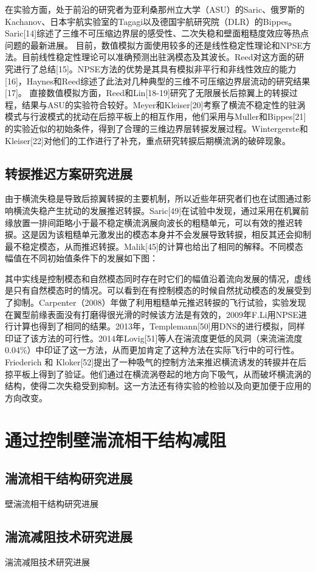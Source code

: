 在实验方面，处于前沿的研究者为亚利桑那州立大学（ASU）的Saric、俄罗斯的Kachanov、日本宇航实验室的Tagagi以及德国宇航研究院（DLR）的Bippes。Saric[14]综述了三维不可压缩边界层的感受性、二次失稳和壁面粗糙度效应等热点问题的最新进展。
目前，数值模拟方面使用较多的还是线性稳定性理论和NPSE方法。目前线性稳定性理论可以准确预测出驻涡模态及其波长。Reed对这方面的研究进行了总结[15]。NPSE方法的优势是其具有模拟非平行和非线性效应的能力[16]，Haynes和Reed综述了此法对几种典型的三维不可压缩边界层流动的研究结果[17]。
直接数值模拟方面，Reed和Lin[18-19]研究了无限展长后掠翼上的转捩过程，结果与ASU的实验符合较好。Meyer和Kleiser[20]考察了横流不稳定性的驻涡模式与行波模式的扰动在后掠平板上的相互作用，他们采用与Muller和Bippes[21]的实验近似的初始条件，得到了合理的三维边界层转捩发展过程。Wintergerste和Kleiser[22]对他们的工作进行了补充，重点研究转捩后期横流涡的破碎现象。

\subsection{转捩推迟方案研究进展}
由于横流失稳是导致后掠翼转捩的主要机制，所以近些年研究者们也在试图通过影响横流失稳产生扰动的发展推迟转捩。Saric[49]在试验中发现，通过采用在机翼前缘放置一排间距略小于最不稳定横流涡展向波长的粗糙单元，可以有效的推迟转捩。这是因为该粗糙单元激发出的模态本身并不会发展导致转捩，相反其还会抑制最不稳定模态，从而推迟转捩。Malik[45]的计算也给出了相同的解释。不同模态幅值在不同初始值条件下的发展如下图：

其中实线是控制模态和自然模态同时存在时它们的幅值沿着流向发展的情况，虚线是只有自然模态时的情况。可以看到在有控制模态的时候自然扰动模态的发展受到了抑制。Carpenter（2008）年做了利用粗糙单元推迟转捩的飞行试验，实验发现在翼型前缘表面没有打磨得很光滑的时候该方法是有效的，2009年F.Li用NPSE进行计算也得到了相同的结果。2013年，Templemann[50]用DNS的进行模拟，同样印证了该方法的可行性。2014年Lovig[51]等人在湍流度更低的风洞（来流湍流度0.04\%）中印证了这一方法，从而更加肯定了这种方法在实际飞行中的可行性。
Friederich 和 Kloker[52]提出了一种吸气的控制方法来推迟横流诱发的转捩并在后掠平板上得到了验证。他们通过在横流涡卷起的地方向下吸气，从而破坏横流涡的结构，使得二次失稳受到抑制。这一方法还有待实验的检验以及向更加便于应用的方向改变。


\section{通过控制壁湍流相干结构减阻}
\subsection{湍流相干结构研究进展}
壁湍流相干结构研究进展
\subsection{湍流减阻技术研究进展}
\label{chap1:sample:table}
湍流减阻技术研究进展

